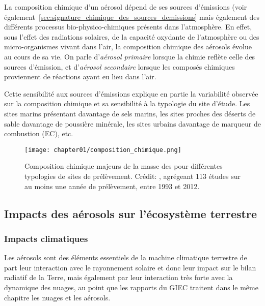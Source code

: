 La composition chimique d'un aérosol dépend de ses sources d'émissions (voir
également~\ref{sec:signature_chimique_des_sources_demissions} mais également des
différents processus bio-physico-chimiques présents dans l'atmosphère. En effet, sous
l'effet des radiations solaires, de la capacité oxydante de l'atmosphère ou des
micro-organismes vivant dans l'air, la composition chimique des aérosols évolue au cours
de sa vie. On parle d'\textit{aérosol primaire} lorsque la chimie reflète celle des
sources d'émission, et d'\textit{aérosol secondaire} lorsque les composés chimiques
proviennent de réactions ayant eu lieu dans l'air.

Cette sensibilité aux sources d'émissions explique en partie la variabilité observée sur
la composition chimique et sa sensibilité à la typologie du site d'étude. Les sites
marins présentant davantage de sels marins, les sites proches des déserts de sable
davantage de poussière minérale, les sites urbains davantage de marqueur de combustion
(EC), etc.

\begin{figure}[htpb]
    \centering
    \texttt{[image: chapter01/composition\_chimique.png]}
    \caption{Composition chimique majeurs de la masse des \PMdix{} pour différentes
        typologies de sites de prélèvement. Crédit: \cite[figure 7.13]{boucherClouds2013},
        agrégeant 113 études sur au moins une année de prélèvement, entre 1993 et 2012.}%
    \label{fig:chapter01/composition_chimique}
\end{figure}

\subsection{Impacts des aérosols sur l'écosystème terrestre}%
\label{sub:impacts_des_aérosols_sur_l_écosystème_terrestre}

\subsubsection{Impacts climatiques}%
\label{ssub:impacts_climatiques}

Les aérosols sont des éléments essentiels de la machine climatique terrestre de part leur
interaction avec le rayonnement solaire et donc leur impact sur le bilan radiatif de la
Terre, mais également par leur interaction très forte avec la dynamique des nuages, au
point que les rapports du GIEC traitent dans le même chapitre les nuages et les aérosols.

